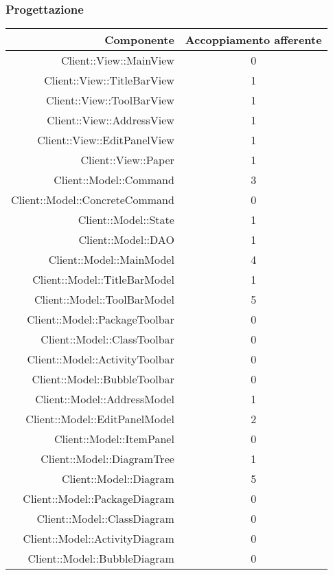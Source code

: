 \documentclass[../PianoDiQualifica.tex]{subfiles}
\begin{document}
			\subsubsection{Progettazione}
				\begin{longtable}{|r|c|}
					\hline
					\rowcolor{blue!30}\textbf{Componente} & \textbf{Accoppiamento afferente} \\
					\hline
					\endhead
					Client::View::MainView & 0 \\ \hline
					Client::View::TitleBarView & 1 \\ \hline
					Client::View::ToolBarView & 1 \\ \hline
					Client::View::AddressView & 1 \\ \hline
					Client::View::EditPanelView & 1 \\ \hline
					Client::View::Paper & 1 \\ \hline
					Client::Model::Command & 3\\ \hline
					Client::Model::ConcreteCommand & 0 \\ \hline
					Client::Model::State & 1 \\ \hline
					Client::Model::DAO & 1 \\ \hline
					Client::Model::MainModel &4 \\ \hline
					Client::Model::TitleBarModel & 1 \\ \hline
					Client::Model::ToolBarModel & 5 \\ \hline
					Client::Model::PackageToolbar & 0 \\ \hline
					Client::Model::ClassToolbar & 0 \\ \hline
					Client::Model::ActivityToolbar & 0 \\ \hline
					Client::Model::BubbleToolbar & 0 \\ \hline
					Client::Model::AddressModel & 1 \\ \hline
					Client::Model::EditPanelModel & 2 \\ \hline
					Client::Model::ItemPanel & 0 \\ \hline
					Client::Model::DiagramTree & 1 \\ \hline
					Client::Model::Diagram & 5 \\ \hline
					Client::Model::PackageDiagram & 0 \\ \hline
					Client::Model::ClassDiagram & 0 \\ \hline
					Client::Model::ActivityDiagram & 0 \\ \hline
					Client::Model::BubbleDiagram & 0 \\ \hline

\end{longtable}
\end{document}
